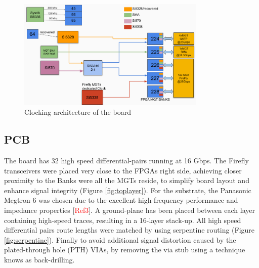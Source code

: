 \documentclass[a4paper]{PoS}
\begin{document}
\begin{figure}[h]
\centering
\includegraphics[width=0.8\textwidth]{clocking.png}
\caption{ Clocking architecture of the board}
\label{clocking}
\end{figure}


\subsection{PCB}
The board has 32 high speed differential-pairs running at 16 Gbps. The Firefly transceivers were placed very close to the FPGAs right side, achieving closer proximity to the Banks were all the MGTs reside, to simplify board layout and enhance signal integrity (Figure \ref{fig:toplayer}). For the substrate, the Panasonic Megtron-6 was chosen due to the excellent high-frequency performance and impedance properties [\textcolor{red}{Ref3}]. A ground-plane has been placed between each layer containing high-speed traces, resulting in a 16-layer stack-up. All high speed differential pairs route lengths were matched by using serpentine routing (Figure \ref{fig:serpentine}). Finally to avoid additional signal distortion caused by the plated-through hole (PTH) VIAs, by removing the via stub using a technique knows as back-drilling.
\end{document}
